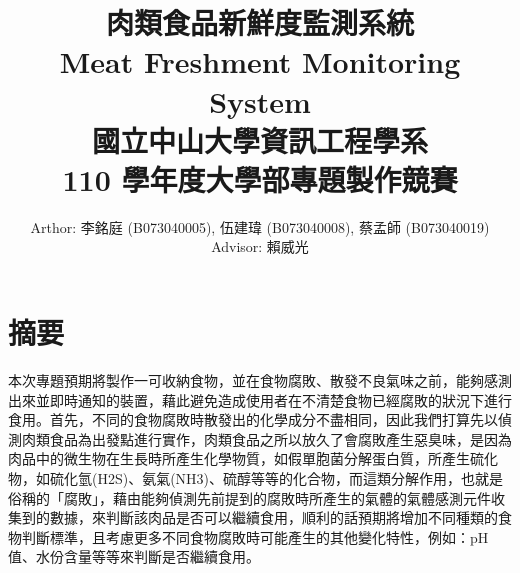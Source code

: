 \documentclass[a4paper, 12pt]{article}
\title{
	{\bf 肉類食品新鮮度監測系統}\\
	{\bf Meat Freshment Monitoring System}\\[2cm]
	國立中山大學資訊工程學系\\
	110 學年度大學部專題製作競賽\\[2cm]
}
\author{
	Arthor: 李銘庭 (B073040005), 伍建瑋 (B073040008), 蔡孟師 (B073040019)\\[1cm]
	Advisor: 賴威光
}
\date{}
\begin{document}
\section{摘要}
本次專題預期將製作一可收納食物，並在食物腐敗、散發不良氣味之前，能夠感測出來並即時通知的裝置，藉此避免造成使用者在不清楚食物已經腐敗的狀況下進行食用。首先，不同的食物腐敗時散發出的化學成分不盡相同，因此我們打算先以偵測肉類食品為出發點進行實作，肉類食品之所以放久了會腐敗產生惡臭味，是因為肉品中的微生物在生長時所產生化學物質，如假單胞菌分解蛋白質，所產生硫化物，如硫化氫(H2S)、氨氣(NH3)、硫醇等等的化合物，而這類分解作用，也就是俗稱的「腐敗」，藉由能夠偵測先前提到的腐敗時所產生的氣體的氣體感測元件收集到的數據，來判斷該肉品是否可以繼續食用，順利的話預期將增加不同種類的食物判斷標準，且考慮更多不同食物腐敗時可能產生的其他變化特性，例如：pH值、水份含量等等來判斷是否繼續食用。 
\end{document}
